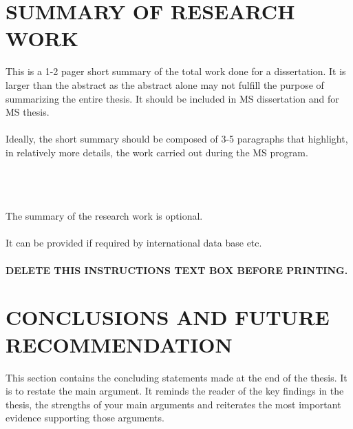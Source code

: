 \documentclass[a4paper,12pt,one side]{report}
\theoremstyle{definition}
\begin{document}
\begin{justify}
\chapter{SUMMARY OF RESEARCH WORK}
 This is a 1-2 pager short summary of the total work done for a dissertation. It is larger than the abstract as the abstract alone may not fulfill the purpose of summarizing the entire thesis. It should be included in MS dissertation and for MS thesis.\\~\\
Ideally, the short summary should be composed of 3-5 paragraphs that highlight, in relatively more details, the work carried out during the MS program.\\~\\
\\~\\

\begin{tcolorbox}[enhanced jigsaw,
    sharp corners,
    boxrule=0.5pt, 
    colback=blue!30!white,   
    borderline={0.5pt}{-2pt}{black,solid} %
 ]
 \begin{justify}
The summary of the research work is optional.\\~\\
It can be provided if required by international data base etc.\\~\\
{\bf DELETE THIS INSTRUCTIONS TEXT BOX BEFORE PRINTING.}
\end{justify}
\end{tcolorbox}
\chapter{CONCLUSIONS AND FUTURE RECOMMENDATION}
\noindent This section contains the concluding statements made at the end of the thesis. It is to restate the main argument. It reminds the reader of the key findings in the thesis, the strengths of your main arguments and reiterates the most important evidence supporting those arguments.\\


\end{justify}
\end{document}
